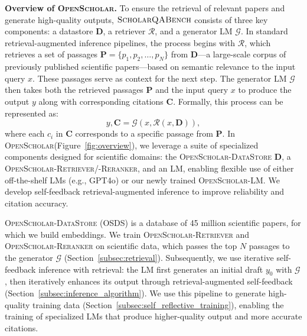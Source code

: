 \documentclass{article} %
\newcommand{\data}{$\textsc{ScholarQABench}$\xspace}
\newcommand{\model}{\textsc{OpenScholar}\xspace}
\renewcommand{\paragraph}[1]{\noindent \textbf{#1}}
\newcommand{\Sref}[1]{Section~\ref{#1}}
\begin{document}
\paragraph{Overview of \model.}
To ensure the retrieval of relevant papers and generate high-quality outputs, \data consists of three key components: a datastore $\mathbf{D}$, a retriever $\mathcal{R}$, and a generator LM $\mathcal{G}$. 
In standard retrieval-augmented inference pipelines, the process begins with $\mathcal{R}$, which retrieves a set of passages $\mathbf{P} = \{p_1, p_2, \ldots, p_N\}$ from $\mathbf{D}$---a large-scale corpus of previously published scientific papers—based on semantic relevance to the input query $x$. These passages serve as context for the next step. 
The generator LM $\mathcal{G}$ then takes both the retrieved passages $\mathbf{P}$ and the input query $x$ to produce the  output $y$ along with corresponding citations $\mathbf{C}$. Formally, this process can be represented as: 
\begin{equation*}
    y, \mathbf{C} = \mathcal{G}(x, \mathcal{R}(x, \mathbf{D})), 
\end{equation*}
where each $c_i$ in $\mathbf{C}$ corresponds to a specific passage from $\mathbf{P}$. 
In \model (Figure~\ref{fig:overview}), we leverage a suite of specialized components designed for scientific domains: the \model-\textsc{DataStore} $\mathbf{D}$, a \model-\textsc{Retriever}/-\textsc{Reranker}, and an LM, enabling flexible use of either off-the-shelf LMs (e.g., GPT4o) or our newly trained \model-LM. We develop self-feedback retrieval-augmented inference to improve reliability and citation accuracy. 

 \model-\textsc{DataStore} (OSDS) is a database of 45 million scientific papers, for which we build embeddings. 
We train \model-\textsc{Retriever} and \model-\textsc{Reranker} on scientific data, which passes the top $N$ passages to the generator $\mathcal{G}$ (Section~\ref{subsec:retrieval}). 
Subsequently, we use iterative self-feedback inference with retrieval: the LM first generates an initial draft $y_0$ with $\mathcal{G}$, then iteratively enhances its output through retrieval-augmented self-feedback (\Sref{subsec:inference_algorithm}).  
We use this pipeline to generate high-quality training data (\Sref{subsec:self_reflective_training}), enabling the training of specialized LMs that produce higher-quality output and more accurate citations. 
\end{document}
